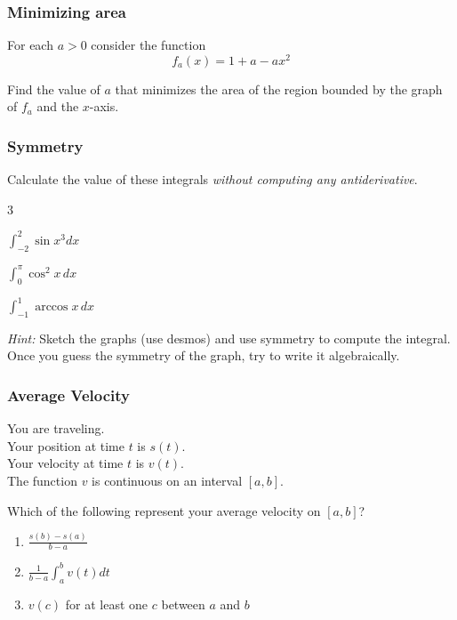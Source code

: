 \begin{frame}[t]
	\frametitle{Minimizing area}

	For each $a >0$ consider the function
	\[
		f_{a}(x) = 1 + a -ax^{2}
	\]

	Find the value of $a$ that minimizes the area of the region bounded by the graph
	of $f_{a}$ and the $x$-axis. \hfill
	\href{https://www.desmos.com/calculator/x7vkfcerdp}{}
\end{frame}

\begin{frame}[t]
	\frametitle{Symmetry}

	Calculate the value of these integrals \emph{without computing any
	antiderivative}.

	\begin{enumerate}
	\end{enumerate}

	\emph{Hint:} Sketch the graphs (use desmos) and use symmetry to compute the integral.
	\\ Once you guess the symmetry of the graph, try to write it algebraically.
	\hfill
	\href{https://www.desmos.com/calculator/ncysdsu3yv}{\beamergotobutton{1}}
	\href{https://www.desmos.com/calculator/fwjs5zoury}{\beamergotobutton{2}}
	\href{https://www.desmos.com/calculator/tjakgza6vf}{\beamergotobutton{3}}
\end{frame}

\begin{frame}[t]
	\fontsize{13}{13}\selectfont
	\frametitle{Average Velocity}

	You are traveling. \\ Your position at time $t$ is $s(t)$. \\ Your velocity at
	time $t$ is $v(t)$. \\ The function $v$ is continuous on an interval $[a,b]$.

	Which of the following represent your average velocity on $[a,b]$?

	\begin{enumerate}
		\item $\displaystyle \frac{s(b) - s(a)}{b-a}$

		\item $\displaystyle \frac{1}{b-a}\int_{a}^{b}v(t) dt$

		\item $v(c)$ for at least one $c$ between $a$ and $b$
	\end{enumerate}
\end{frame}

